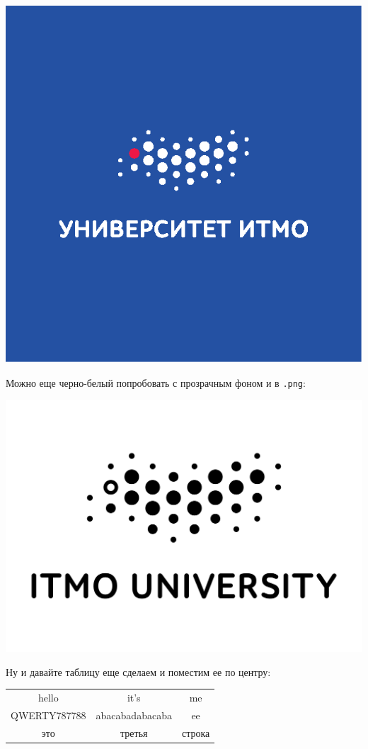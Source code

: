\documentclass{article}
\begin{document}
\includegraphics[scale=0.5]{itmo_logo_rus_vert_blue.eps}

Можно еще черно-белый попробовать с прозрачным фоном и в \texttt{.png}:

\includegraphics[scale=0.2]{bw_eng.png}

Ну и давайте таблицу еще сделаем и поместим ее по центру:

\begin{center}
  \begin{tabular}{|c|cc|} %
  \hline
    hello & it's & me \\
    QWERTY787788 & abacabadabacaba & ee \\
  \hline
    это & третья & строка \\
  \hline
  \end{tabular}
\end{center}
\end{document}

